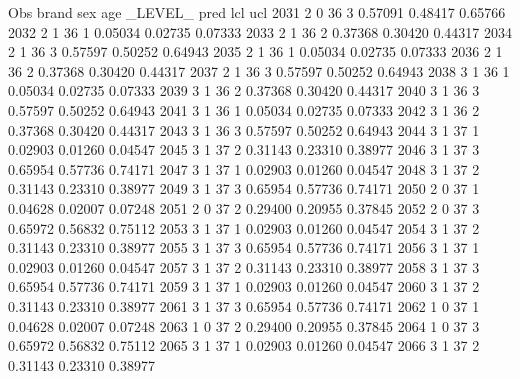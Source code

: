 \documentclass{article}
\begin{document}
\begin{Woutput}
 Obs    brand    sex    age    _LEVEL_      pred       lcl        ucl
2031      2       0      36       3       0.57091    0.48417    0.65766
2032      2       1      36       1       0.05034    0.02735    0.07333
2033      2       1      36       2       0.37368    0.30420    0.44317
2034      2       1      36       3       0.57597    0.50252    0.64943
2035      2       1      36       1       0.05034    0.02735    0.07333
2036      2       1      36       2       0.37368    0.30420    0.44317
2037      2       1      36       3       0.57597    0.50252    0.64943
2038      3       1      36       1       0.05034    0.02735    0.07333
2039      3       1      36       2       0.37368    0.30420    0.44317
2040      3       1      36       3       0.57597    0.50252    0.64943
2041      3       1      36       1       0.05034    0.02735    0.07333
2042      3       1      36       2       0.37368    0.30420    0.44317
2043      3       1      36       3       0.57597    0.50252    0.64943
2044      3       1      37       1       0.02903    0.01260    0.04547
2045      3       1      37       2       0.31143    0.23310    0.38977
2046      3       1      37       3       0.65954    0.57736    0.74171
2047      3       1      37       1       0.02903    0.01260    0.04547
2048      3       1      37       2       0.31143    0.23310    0.38977
2049      3       1      37       3       0.65954    0.57736    0.74171
2050      2       0      37       1       0.04628    0.02007    0.07248
2051      2       0      37       2       0.29400    0.20955    0.37845
2052      2       0      37       3       0.65972    0.56832    0.75112
2053      3       1      37       1       0.02903    0.01260    0.04547
2054      3       1      37       2       0.31143    0.23310    0.38977
2055      3       1      37       3       0.65954    0.57736    0.74171
2056      3       1      37       1       0.02903    0.01260    0.04547
2057      3       1      37       2       0.31143    0.23310    0.38977
2058      3       1      37       3       0.65954    0.57736    0.74171
2059      3       1      37       1       0.02903    0.01260    0.04547
2060      3       1      37       2       0.31143    0.23310    0.38977
2061      3       1      37       3       0.65954    0.57736    0.74171
2062      1       0      37       1       0.04628    0.02007    0.07248
2063      1       0      37       2       0.29400    0.20955    0.37845
2064      1       0      37       3       0.65972    0.56832    0.75112
2065      3       1      37       1       0.02903    0.01260    0.04547
2066      3       1      37       2       0.31143    0.23310    0.38977

\end{Woutput}
\end{document}
